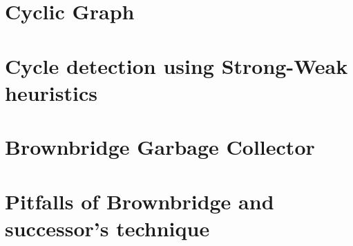 \section{Cyclic Graph}
\section{Cycle detection using Strong-Weak heuristics}
\section{Brownbridge Garbage Collector}
\section{Pitfalls of Brownbridge and successor's technique}
